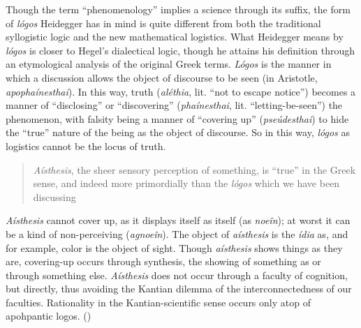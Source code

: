 \documentclass[leqno, 12pt]{turabian-researchpaper}
\begin{document}
	Though the term \enquote{phenomenology} implies a science through its suffix, the
	form of \textit{l\'ogos} Heidegger has in mind is quite different from both
	the traditional syllogistic logic and the new mathematical logistics. What Heidegger
	means by \textit{l\'ogos} is closer to Hegel's dialectical logic, though he attains
	his definition through an etymological analysis of the original Greek terms.
	\textit{L\'ogos} is the manner in which a discussion allows the object of discourse
	to be seen (in Aristotle, \textit{apopha\'inesthai}). In this way, truth (\textit{al\'ethia},
	lit. \enquote{not to escape notice}) becomes a manner of \enquote{disclosing}
	or \enquote{discovering} (\textit{pha\'inesthai}, lit. \enquote{letting-be-seen})
	the phenomenon, with falsity being a manner of \enquote{covering up} (\textit{pse\'udesthai})
	to hide the \enquote{true} nature of the being as the object of discourse. So
	in this way, \textit{l\'ogos} as logistics cannot be the locus of truth. \blockquote[{}]
	{\textit{A\'isthesis}, %
	the sheer sensory perception of something, is \enquote{true} in the Greek sense, and indeed %
	more primordially than the \textit{l\'ogos} which we have been discussing}. \textit{A\'isthesis}
	cannot cover up, as it displays itself as itself (as \textit{noe\^in}); at worst
	it can be a kind of non-perceiving (\textit{agnoe\^in}). The object of \textit{a\'isthesis}
	is the \textit{\'idia} as, and for example, color is the object of sight.
	Though \textit{a\'isthesis} shows things as they are, covering-up occurs
	through synthesis, the showing of something as or through something else.
	\textit{A\'isthesis} does not occur through a faculty of cognition, but
	directly, thus avoiding the Kantian dilemma of the interconnectedness of our faculties.
	Rationality in the Kantian-scientific sense occurs only atop of apohpantic
	logos. ()
\end{document}
